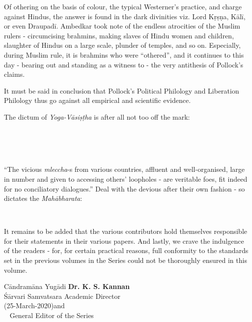 
Of othering on the basis of colour, the typical Westerner’s practice, and charge against Hindus, the answer is found in the dark divinities viz. Lord Kṛṣṇa, Kālī, or even Draupadī. Ambedkar took note of the endless atrocities of the Muslim rulers - circumcising brahmins, making slaves of Hindu women and children, slaughter of Hindus on a large scale, plunder of temples, and so on. Especially, during Muslim rule, it is brahmins who were “othered”, and it continues to this day - bearing out and standing as a witness to - the very antithesis of Pollock’s claims.

It must be said in conclusion that Pollock’s Political Philology and Liberation Philology thus go against all empirical and scientific evidence.

The dictum of \textit{Yoga-Vāsiṣṭha} is after all not too off the mark:
\begin{center}
 \\\\ \\
\end{center}

“The vicious \textit{mleccha}-s from various countries, affluent and well-organised, large in number and given to accessing others’ loopholes - are veritable foes, fit indeed for no conciliatory dialogues.” Deal with the devious after their own fashion - so dictates the \textit{Mahābharata}:
\begin{center}
\\
\end{center}

It remains to be added that the various contributors hold themselves responsible for their statements in their various papers. And lastly, we crave the indulgence of the readers - for, for certain practical reasons, full conformity to the standards set in the previous volumes in the Series could not be thoroughly ensured in this volume.


\vspace{0.35cm}

Cāndramāna Yugādi  \hfill \textbf{Dr. K. S. Kannan}\\
Śārvari Samvatsara \hfill Academic Director\\
 (25-March-2020)\hfill and\\
 \phantom{a}~ \hfill General Editor of the Series


